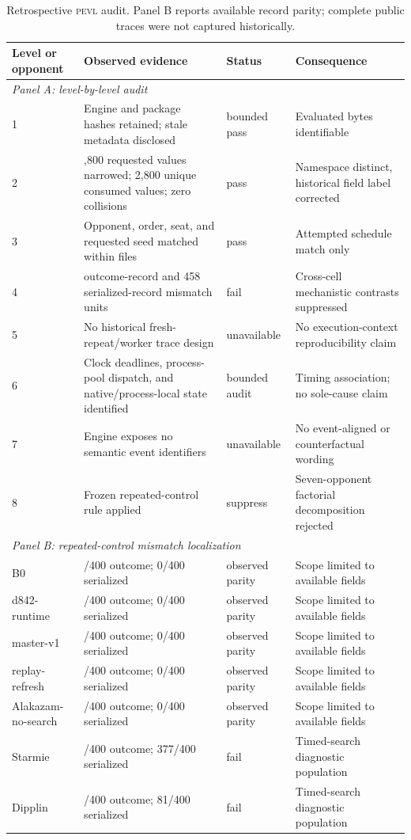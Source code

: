 \documentclass[aps,reprint,superscriptaddress,longbibliography,floatfix]{revtex4-2}
\newcommand{\PEVL}{\textsc{pevl}}
\begin{document}
\begin{table}[t]
\caption{Retrospective \PEVL{} audit.  Panel B reports available record parity;
complete public traces were not captured historically.}
\label{tab:retrospective}
\footnotesize
\begin{ruledtabular}
\begin{tabularx}{\textwidth}{l>{\raggedright\arraybackslash}Xl>{\raggedright\arraybackslash}X}
Level or opponent & Observed evidence & Status & Consequence \\
\hline
\multicolumn{4}{l}{\textit{Panel A: level-by-level audit}}\\
1 & Engine and package hashes retained; stale metadata disclosed & bounded pass & Evaluated bytes identifiable \\
2 & 2,800 requested values narrowed; 2,800 unique consumed values; zero collisions & pass & Namespace distinct, historical field label corrected \\
3 & Opponent, order, seat, and requested seed matched within files & pass & Attempted schedule match only \\
4 & 210 outcome-record and 458 serialized-record mismatch units & fail & Cross-cell mechanistic contrasts suppressed \\
5 & No historical fresh-repeat/worker trace design & unavailable & No execution-context reproducibility claim \\
6 & Clock deadlines, process-pool dispatch, and native/process-local state identified & bounded audit & Timing association; no sole-cause claim \\
7 & Engine exposes no semantic event identifiers & unavailable & No event-aligned or counterfactual wording \\
8 & Frozen repeated-control rule applied & suppress & Seven-opponent factorial decomposition rejected \\
\hline
\multicolumn{4}{l}{\textit{Panel B: repeated-control mismatch localization}}\\
B0 & 0/400 outcome; 0/400 serialized & observed parity & Scope limited to available fields \\
d842-runtime & 0/400 outcome; 0/400 serialized & observed parity & Scope limited to available fields \\
master-v1 & 0/400 outcome; 0/400 serialized & observed parity & Scope limited to available fields \\
replay-refresh & 0/400 outcome; 0/400 serialized & observed parity & Scope limited to available fields \\
Alakazam-no-search & 0/400 outcome; 0/400 serialized & observed parity & Scope limited to available fields \\
Starmie & 191/400 outcome; 377/400 serialized & fail & Timed-search diagnostic population \\
Dipplin & 19/400 outcome; 81/400 serialized & fail & Timed-search diagnostic population \\
\end{tabularx}
\end{ruledtabular}
\end{table}
\end{document}
